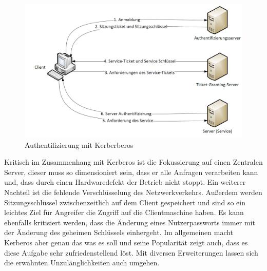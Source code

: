 \documentclass[
a4paper,   
titlepage,  
halfparskip,
12pt        
]{scrartcl}
\begin{document}
\begin{onehalfspacing}
\begin{figure}[h]
	\centering
	\includegraphics[width=1\linewidth]{kerberos.png}
	\caption[Kerberos]{Authentifizierung mit Kerberberos \cite[vgl. S.140]{kerberos2}}
	\label{fig:kerb}
\end{figure}
Kritisch im Zusammenhang mit Kerberos ist die Fokussierung auf einen Zentralen Server, dieser muss so dimensioniert sein, dass er alle Anfragen verarbeiten kann und, dass durch einen Hardwaredefekt der Betrieb nicht stoppt. Ein weiterer Nachteil ist die fehlende Verschlüsselung des Netzwerkverkehrs. Außerdem werden Sitzungsschlüssel zwischenzeitlich auf dem Client gespeichert und sind so ein leichtes Ziel für Angreifer die Zugriff auf die Clientmaschine haben. Es kann ebenfalls kritisiert werden, dass die Änderung eines Nutzerpassworts immer mit der Änderung des geheimen Schlüssels einhergeht. Im allgemeinen macht Kerberos aber genau das was es soll und seine Popularität zeigt auch, dass es diese Aufgabe sehr zufriedenstellend löst. Mit diversen Erweiterungen lassen sich die erwähnten Unzulänglichkeiten auch umgehen.\cite[vgl. S.138f]{kerberos2}


\end{onehalfspacing}
\end{document}
